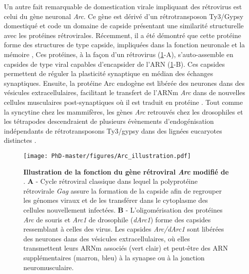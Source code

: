 Un autre fait remarquable de domestication virale impliquant des rétrovirus est celui du gène neuronal \textit{Arc}. Ce gène est dérivé d'un rétrotransposon Ty3/Gypsy domestiqué et code un domaine de capside présentant une similarité structurelle avec les protéines rétrovirales. Récemment, il a été  démontré que cette protéine forme des structures de type capside, impliquées dans la fonction neuronale et la mémoire \citep{ashley_retrovirus-like_2018}, Ces protéines, à la façon d'un rétrovirus (\figurename{\ref{figure:Arc_illustration}}-A), s'auto-assemble en capsides de type viral capables d'encapsider de l'ARN (\figurename{\ref{figure:Arc_illustration}}-B). Ces capsides permettent de réguler la plasticité synaptique en médian des échanges synaptiques. Ensuite, la protéine Arc endogène est libérée des neurones dans des vésicules extracellulaires, facilitant le transfert de l'ARNm \textit{Arc} dans de nouvelles cellules musculaires post-synaptiques  où il est traduit en protéine \citep{ashley_retrovirus-like_2018, pastuzyn_neuronal_2018}. 
Tout comme la syncytine chez les mammifères, les gènes \textit{Arc} retrouvés chez les drosophiles et les tétrapodes descendraient de plusieurs évènements d'endogénisation indépendants de rétrotransposons Ty3/gypsy dans des lignées eucaryotes distinctes \citep{pastuzyn_neuronal_2018}. \\

\begin{figure}[H]
\captionsetup{font=footnotesize}
 \centering
  \texttt{[image: PhD-master/figures/Arc\_illustration.pdf]}
\caption[Intro:Illustration de la fonction du gène rétroviral \textit{Arc}]{\textbf{Illustration de la fonction du gène rétroviral \textit{Arc} modifié de \cite{parrish_viral_2018}}. \textbf{A} - Cycle rétroviral classique dans lequel la polyprotéine rétrovirale \textit{Gag} assure la formation de la capside afin de regrouper les génomes viraux et de les transférer dans le cytoplasme des cellules nouvellement infectées. \textbf{B} - L'oligomérisation des protéines \textit{Arc} de souris et \textit{Arc1} de drosophile (\textit{dArc1}) forme des capsides ressemblant à celles des virus. Les capsides \textit{Arc/dArc1} sont libérées des neurones dans des vésicules extracellulaires, où elles transmettent leurs ARNm associés (vert clair) et peut-être des ARN supplémentaires (marron, bleu) à la synapse ou à la jonction neuromusculaire.} 
\label{figure:Arc_illustration}
\end{figure} \newpage


